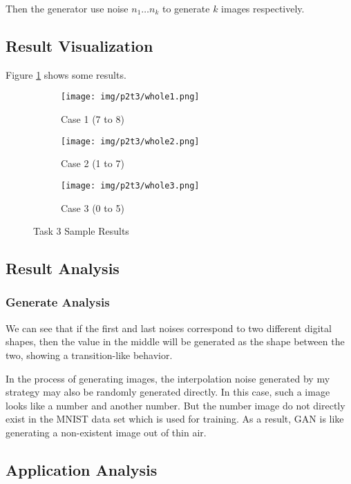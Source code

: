 Then the generator use noise $n_1 \ldots n_k$ to generate $k$ images respectively.

\subsection{Result Visualization}

Figure \ref{fig:p2t3_results} shows some results.

\begin{figure}[!htbp]
  \centering
  \begin{subfigure}[b]{0.85\textwidth}
    \texttt{[image: img/p2t3/whole1.png]}
    \caption{Case 1 (7 to 8)}
  \end{subfigure}
  \begin{subfigure}[b]{0.85\textwidth}
    \texttt{[image: img/p2t3/whole2.png]}
    \caption{Case 2 (1 to 7)}
  \end{subfigure}
  \begin{subfigure}[b]{0.85\textwidth}
    \texttt{[image: img/p2t3/whole3.png]}
    \caption{Case 3 (0 to 5)}
  \end{subfigure}
  \caption{Task 3 Sample Results}
  \label{fig:p2t3_results}
\end{figure}

\subsection{Result Analysis}

\subsubsection{Generate Analysis}

We can see that if the first and last noises correspond to two different digital shapes, then the value in the middle will be generated as the shape between the two, showing a transition-like behavior.

In the process of generating images, the interpolation noise generated by my strategy may also be randomly generated directly. In this case, such a image looks like a number and another number.
But the number image do not directly exist in the MNIST data set which is used for training. As a result, GAN is like generating a non-existent image  out of thin air.

\subsection{Application Analysis}


